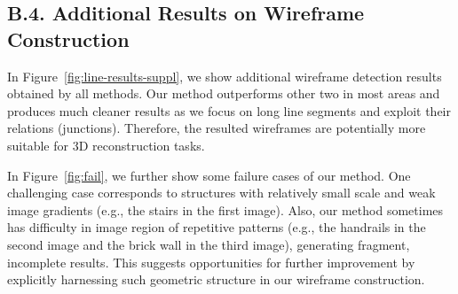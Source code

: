 \documentclass[10pt,twocolumn,letterpaper]{article}
\begin{document}
\subsection*{B.4. Additional Results on Wireframe Construction}
In Figure~\ref{fig:line-results-suppl}, we show additional wireframe detection results obtained by all methods. Our method outperforms other two in most areas and produces much cleaner results as we focus on long line segments and exploit their relations (junctions). Therefore, the resulted wireframes are potentially more suitable for 3D reconstruction tasks. 

In Figure~\ref{fig:fail}, we further show some failure cases of our method. One challenging case corresponds to structures with relatively small scale and weak image gradients (e.g., the stairs in the first image). Also, our method sometimes has difficulty in image region of repetitive patterns (e.g., the handrails in the second image and the brick wall in the third image), generating fragment, incomplete results. This suggests opportunities for further improvement by explicitly harnessing such geometric structure in our wireframe construction. 
\end{document}
